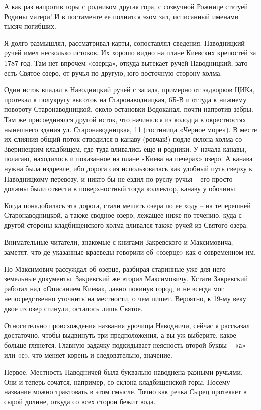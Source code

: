 А как раз напротив горы с родником другая гора, с созвучной Рожнице статуей Родины матери! И в постаменте ее полнится эхом зал, исписанный именами тысяч погибших.

Я долго размышлял, рассматривал карты, сопоставлял сведения. Наводницкий ручей имел несколько истоков. Их хорошо видно на плане Киевских крепостей за 1787 год. Там нет впрочем «озерца», откуда вытекает ручей Наводницкий, зато есть Святое озеро, от ручья по другую, юго-восточную сторону холма.

Один исток впадал в Наводницкий ручей с запада, примерно от задворков ЦИКа, протекал к полукругу высоток на Старонаводницкая, 6Б-В и оттуда к нижнему повороту Старонаводницкой, около остановки Водоканал, почти напротив зебры. Там же присоединялся другой исток, что начинался из колодца в окрестностях нынешнего здания ул. Старонаводницкая, 11 (гостиница «Черное море»). В месте их слияния общий поток отводился в канаву (ровчак!) подле склона холма со Зверинецким кладбищем, где туда вливались еще и родники. У начала канавы, полагаю, находилось и показанное на плане «Киева на печерах» озеро. А канава нужна была издревле, ибо дорога сия использовалась как удобный путь сверху к Наводницкому перевозу, и никто бы не ездил по руслу ручья – его просто должны были отвести в поверхностный тогда коллектор, канаву у обочины.

Когда понадобилась эта дорога, стали мешать озера по ее ходу – на теперешней Старонаводницкой, а также сводное озеро, лежащее ниже по течению, куда с другой стороны кладбищенского холма вливался также ручей из Святого озера.

Внимательные читатели, знакомые с книгами Закревского и Максимовича, заметят, что-де указанные краеведы говорили об «озерце» как о современном им. 

Но Максимович рассуждал об озерце, разбирая старинные уже для него земельные документы. Закревский же вторил Максимовичу. Кстати Закревский работал над «Описанием Киева», давно покинув город, и не всегда мог непосредственно уточнить на местности, о чем пишет. Вероятно, к 19-му веку двое из озер сгинули, осталось лишь Святое.

Относительно происхождения названия урочища Наводничи, сейчас я рассказал достаточно, чтобы выдвинуть три предположения, а вы уж выберите, какое больше глянется. Главную задачку подкидывает неясность второй буквы – «а» или «е», что меняет корень и следовательно, значение.

Первое. Местность Наводничей была буквально наводнена разными ручьями. Они и теперь сочатся, например, со склона кладбищенской горы. Посему название можно трактовать в этом смысле. Точно как речка Сырец протекает в сырой долине, откуда со всех сторон бежит вода.

